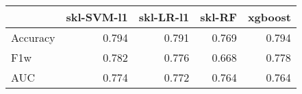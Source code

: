 \begin{tabular}{lrrrr}
\toprule
{} &  skl-SVM-l1 &  skl-LR-l1 &  skl-RF &  xgboost \\
\midrule
Accuracy &       0.794 &      0.791 &   0.769 &    0.794 \\
F1w      &       0.782 &      0.776 &   0.668 &    0.778 \\
AUC      &       0.774 &      0.772 &   0.764 &    0.764 \\
\bottomrule
\end{tabular}
